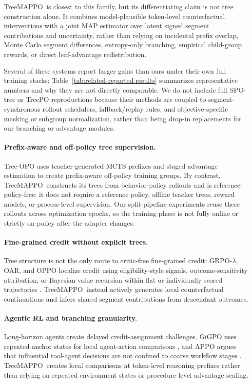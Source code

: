 \documentclass{article}
\newcommand{\ours}{TreeMAPPO\xspace}
\begin{document}
\ours\ is closest to this family, but its differentiating claim is not tree construction alone. It combines model-plausible token-level counterfactual interventions with a joint MAP estimator over latent signed segment contributions and uncertainty, rather than relying on incidental prefix overlap, Monte Carlo segment differences, entropy-only branching, empirical child-group rewards, or direct leaf-advantage redistribution.

Several of these systems report larger gains than ours under their own full training stacks; Table~\ref{tab:related-reported-results} summarizes representative numbers and why they are not directly comparable. We do not include full SPO-tree or TreePO reproductions because their methods are coupled to segment-synchronous rollout schedulers, fallback/replay rules, and objective-specific masking or subgroup normalization, rather than being drop-in replacements for our branching or advantage modules.

\paragraph{Prefix-aware and off-policy tree supervision.}
Tree-OPO \cite{treeopo2025} uses teacher-generated MCTS prefixes and staged advantage estimation to create prefix-aware off-policy training groups. By contrast, \ours\ constructs its trees from behavior-policy rollouts and is reference-policy-free: it does not require a reference policy, offline teacher trees, reward models, or process-level supervision. Our split-pipeline experiments reuse these rollouts across optimization epochs, so the training phase is not fully online or strictly on-policy after the adapter changes.

\paragraph{Fine-grained credit without explicit trees.}
Tree structure is not the only route to critic-free fine-grained credit: GRPO-$\lambda$, OAR, and OPPO localize credit using eligibility-style signals, outcome-sensitivity attribution, or Bayesian value recursion within flat or individually scored trajectories \cite{grpolambda2025,oar2026,oppo2026}. \ours\ instead actively generates local counterfactual continuations and infers shared segment contributions from descendant outcomes.

\paragraph{Agentic RL and branching granularity.}
Long-horizon agents create delayed credit-assignment challenges. GiGPO uses repeated anchor states for local agent-action comparisons \cite{gigpo2025}, and APPO argues that influential tool-agent decisions are not confined to coarse workflow stages \cite{appo2026}. \ours\ creates local comparisons at token-level reasoning prefixes rather than relying on repeated environment states or procedure-level advantage scaling.
\end{document}
